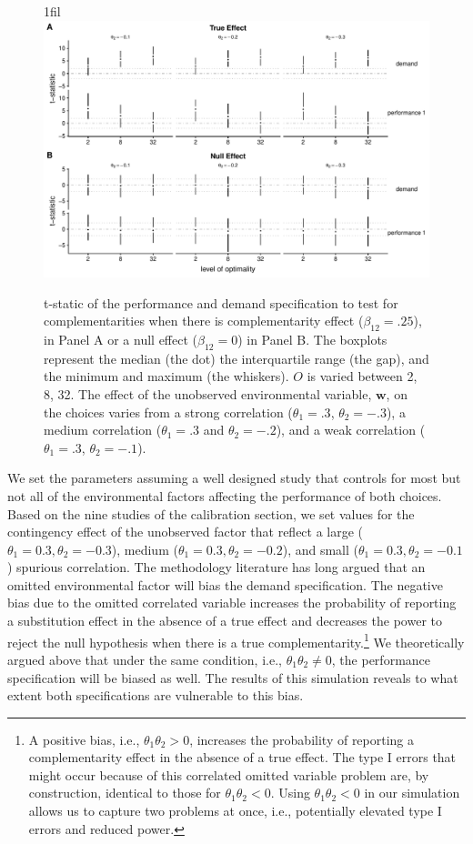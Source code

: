 \documentclass[12pt]{article}
\makeatletter
\newcommand*{\centerfloat}{%
  \parindent \z@
  \leftskip \z@ \@plus 1fil \@minus \textwidth
  \rightskip\leftskip
  \parfillskip \z@skip}
\makeatother
\begin{document}
\begin{figure}
\centerfloat
\includegraphics[width=450px]{figure-latex/spurious_new_plot.pdf}
\caption[Error Rate and Power with Unobserved Environmental Variables]
{\label{spurious} t-static of the performance and demand specification to test
for complementarities when there is complementarity effect ($\beta_{12} = .25$),
in Panel A or a null effect ($\beta_{12} = 0$) in Panel B. The boxplots represent the median (the dot) the interquartile range (the gap), and the minimum and maximum (the whiskers). $O$ is varied between 2, 8, 32. The effect of the unobserved environmental variable, $\mathbf{w}$, on the choices varies from a strong correlation ($\theta_1 = .3$, $\theta_2 = -.3$), a medium correlation ($\theta_1 = .3$ and $\theta_2 = -.2$), and a weak correlation ($\theta_1 =.3$, $\theta_2 = -.1$).}
\end{figure}



We set the parameters assuming a well designed study that controls for most but not all of the environmental factors affecting the performance of both choices. Based on the nine studies of the calibration section, we set values for the contingency effect of the unobserved factor that reflect a large ($\theta_1 = 0.3, \theta_2 = -0.3$), medium ($\theta_1 = 0.3, \theta_2 = -0.2$), and small ($\theta_1 = 0.3, \theta_2 = -0.1$) spurious correlation. The methodology literature has long argued that an omitted environmental factor will bias the demand specification. The negative bias due to the omitted correlated variable increases the probability of reporting a substitution effect in the absence of a true effect and decreases the power to reject the null hypothesis when there is a true complementarity.\footnote{A positive bias, i.e., $\theta_1 \theta_2 > 0$, increases the probability of reporting a complementarity effect in the absence of a true effect. The type I errors that might occur because of this correlated omitted variable problem are, by construction, identical to those for $\theta_1 \theta_2 < 0$. Using $\theta_1 \theta_2 < 0$ in our simulation allows us to capture two problems at once, i.e., potentially elevated type I errors and reduced power.}  We theoretically argued above that under the same condition, i.e., $\theta_1 \theta_2 \neq 0$, the performance specification will be biased as well. The results of this simulation reveals to what extent both specifications are vulnerable to this bias.
\end{document}
